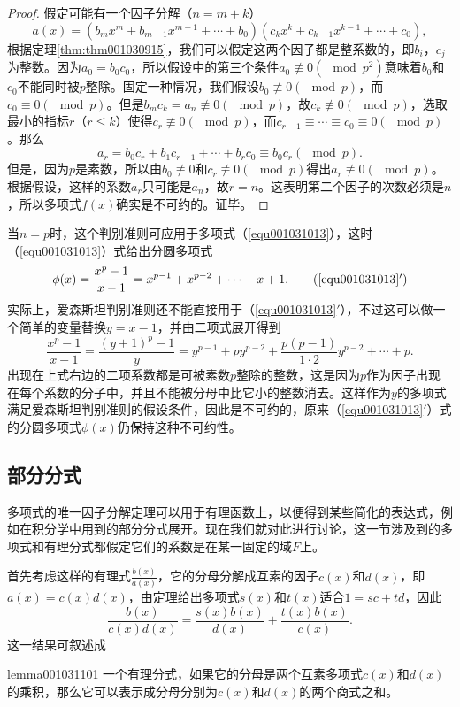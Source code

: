 \begin{proof}
假定可能有一个因子分解（$n=m+k$）
\[
a(x)=(b_mx^m+b_{m-1}x^{m-1}+\cdots + b_0)(c_kx^k+c_{k-1}x^{k-1} + \cdots + c_0),
\]
根据定理\ref{thm:thm001030915}，我们可以假定这两个因子都是整系数的，即$b_i$，$c_j$为整数。因为$a_0=b_0c_0$，所以假设中的第三个条件$a_0 \not\equiv 0 (\mod{p^2})$意味着$b_0$和$c_0$不能同时被$p$整除。固定一种情况，我们假设$b_0 \not\equiv 0(\mod{p})$，而$c_0 \equiv 0(\mod{p})$。但是$b_mc_k = a_n \not\equiv 0(\mod{p})$，故$c_k \not\equiv 0(\mod{p})$，选取最小的指标$r$（$r \le k$）使得$c_r \not\equiv 0(\mod{p})$，而$c_{r-1}\equiv\cdots\equiv c_0 \equiv 0(\mod{p})$。那么
\[
a_r = b_0c_r + b_1c_{r-1} + \cdots + b_rc_0 \equiv b_0c_r(\mod{p}).
\]
但是，因为$p$是素数，所以由$b_0 \not\equiv 0$和$c_r \not\equiv 0(\mod{p})$得出$a_r \not\equiv 0(\mod{p})$。根据假设，这样的系数$a_r$只可能是$a_n$，故$r=n$。这表明第二个因子的次数必须是$n$，所以多项式$f(x)$确实是不可约的。证毕。
\end{proof}

当$n=p$时，这个判别准则可应用于多项式（\ref{equ001031013}），这时（\ref{equ001031013}）式给出分圆多项式
\begin{equation}
\phi(x)=\frac{x^p-1}{x-1}=x^{p-1}+x^{p-2}+\cdots +x+1. \tag{\ref{equ001031013}$'$}
\end{equation}
实际上，爱森斯坦判别准则还不能直接用于（\ref{equ001031013}$'$），不过这可以做一个简单的变量替换$y = x - 1$，并由二项式展开得到
\[
\frac{x^p-1}{x-1} = \frac{(y+1)^p-1}{y} = y^{p-1} + py^{p-2} + \frac{p(p-1)}{1 \cdot 2}y^{p-2} + \cdots + p.
\]
出现在上式右边的二项系数都是可被素数$p$整除的整数，这是因为$p$作为因子出现在每个系数的分子中，并且不能被分母中比它小的整数消去。这样作为$y$的多项式满足爱森斯坦判别准则的假设条件，因此是不可约的，原来（\ref{equ001031013}$'$）式的分圆多项式$\phi(x)$仍保持这种不可约性。


\subsection{部分分式}\label{subsection0010311}
多项式的唯一因子分解定理可以用于有理函数上，以便得到某些简化的表达式，例如在积分学中用到的部分分式展开。现在我们就对此进行讨论，这一节涉及到的多项式和有理分式都假定它们的系数是在某一固定的域$F$上。

首先考虑这样的有理式$\frac{b(x)}{a(x)}$，它的分母分解成互素的因子$c(x)$和$d(x)$，即$a(x)=c(x)d(x)$，由定理给出多项式$s(x)$和$t(x)$适合$1 = sc+td$，因此
\begin{equation}\label{equ001031114}
\frac{b(x)}{c(x)d(x)} = \frac{s(x)b(x)}{d(x)} + \frac{t(x)b(x)}{c(x)}.
\end{equation}
这一结果可叙述成
\begin{lemma}{}{lemma001031101}
一个有理分式，如果它的分母是两个互素多项式$c(x)$和$d(x)$的乘积，那么它可以表示成分母分别为$c(x)$和$d(x)$的两个商式之和。
\end{lemma}

